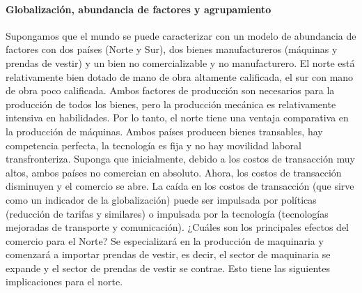 \paragraph{Globalización, abundancia de factores y agrupamiento}
Supongamos que el mundo se puede caracterizar con un modelo de abundancia de factores con dos países (Norte y Sur), dos bienes manufactureros (máquinas y prendas de vestir) y un bien no comercializable y no manufacturero. El norte está relativamente bien dotado de mano de obra altamente calificada, el sur con mano de obra poco calificada. Ambos factores de producción son necesarios para la producción de todos los bienes, pero la producción mecánica es relativamente intensiva en habilidades. Por lo tanto, el norte tiene una ventaja comparativa en la producción de máquinas. Ambos países producen bienes transables, hay competencia perfecta, la tecnología es fija y no hay movilidad laboral transfronteriza. Suponga que inicialmente, debido a los costos de transacción muy altos, ambos países no comercian en absoluto. Ahora, los costos de transacción disminuyen y el comercio se abre. La caída en los costos de transacción (que sirve como un indicador de la globalización) puede ser impulsada por políticas (reducción de tarifas y similares) o impulsada por la tecnología (tecnologías mejoradas de transporte y comunicación). ¿Cuáles son los principales efectos del comercio para el Norte? Se especializará en la producción de maquinaria y comenzará a importar prendas de vestir, es decir, el sector de maquinaria se expande y el sector de prendas de vestir se contrae. Esto tiene las siguientes implicaciones para el norte.
